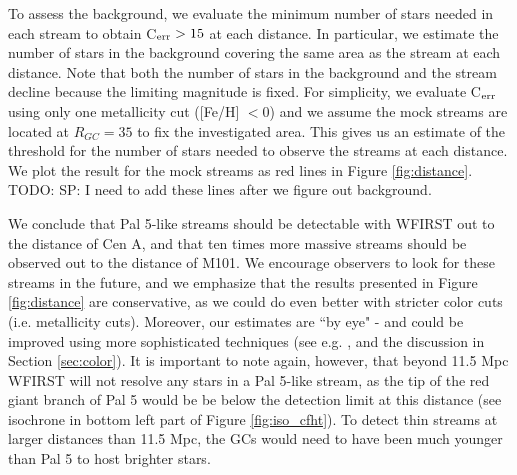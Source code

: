 \documentclass[twocolumn]{aastex62}
\newcommand{\todo}[1]{{\color{red} TODO: #1}}
\begin{document}

To assess the background, we evaluate the minimum number of stars needed in each stream to obtain C$_{\rm err} > 15$ at each distance. In particular, we estimate the number of stars in the background covering the same area as the stream at each distance. Note that both the number of stars in the background and the stream decline because the limiting magnitude is fixed. For simplicity, we evaluate C$_{\rm err}$ using only one metallicity cut ([Fe/H] $< 0$) and we assume the mock streams are located at $R_{GC} = 35$ to fix the investigated area. This gives us an estimate of the threshold for the number of stars needed to observe the streams at each distance. We plot the result for the mock streams as red lines in Figure \ref{fig:distance}. \todo{SP: I need to add these lines after we figure out background}.

%

We conclude that Pal 5-like streams should be detectable with WFIRST out to the distance of Cen A, and that ten times more massive streams should be observed out to the distance of M101. We encourage observers to look for these streams in the future, and we emphasize that the results presented in Figure \ref{fig:distance} are conservative, as we could do even better with stricter color cuts (i.e. metallicity cuts). Moreover, our estimates are ``by eye" - and could be improved using more sophisticated techniques (see e.g. \citealt{malhan18}, and the discussion in Section \ref{sec:color}). It is important to note again, however, that beyond 11.5 Mpc WFIRST will not resolve any stars in a Pal 5-like stream, as the tip of the red giant branch of Pal 5 would be be below the detection limit at this distance (see isochrone in bottom left part of Figure \ref{fig:iso_cfht}). To detect thin streams at larger distances than 11.5 Mpc, the GCs would need to have been much younger than Pal 5 to host brighter stars. 
\end{document}
